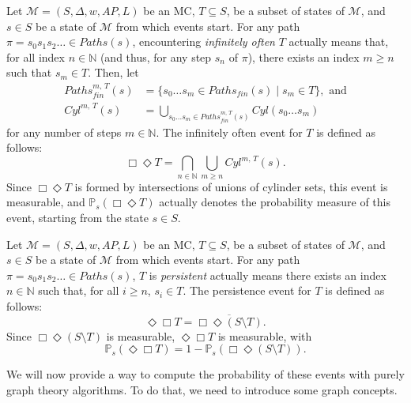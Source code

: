 \begin{definition}
  Let $\mathcal{M}=(S, \Delta, w, AP, L)$ be an MC, $T \subseteq S$, be a subset of states of $\mathcal{M}$, and
  $s \in S$ be a state of $\mathcal{M}$ from which events start. For any path $\pi = s_0 s_1 s_2 \dots \in Paths(s)$,
encountering \textit{infinitely often} $T$ actually means that, for all index $n \in \mathbb{N}$ (and thus, for any step $s_n$ of $\pi$), there exists an index $m \geq n$ such that $s_m \in T$. Then, let
  \begin{align*}
    Paths_{fin}^{m,\, T}(s) &= \{ s_0\dots s_m \in Paths_{fin}(s) \; | \; s_m \in T \}, \text{ and} \\
    Cyl^{m,\, T}(s) &= \bigcup_{s_0 \dots s_m \in Paths_{fin}^{m, \, T}(s)} Cyl(s_0\dots s_m)
  \end{align*}
  for any number of steps $m \in \mathbb{N}$. The infinitely often event for $T$ is defined as follows:
  \[
    \Box \Diamond T = \bigcap_{n \in \mathbb{N}} \bigcup_{m \geq n} Cyl^{m, \, T}(s).
  \]
  Since $\Box \Diamond T$ is formed by intersections of unions of cylinder sets, this event is measurable, and $\mathbb{P}_s(\Box\Diamond T)$ actually denotes the probability measure of this event, starting from the state $s \in S$.
\end{definition}

\begin{definition}
  Let $\mathcal{M}=(S, \Delta, w, AP, L)$ be an MC, $T \subseteq S$, be a subset of states of $\mathcal{M}$, and
  $s \in S$ be a state of $\mathcal{M}$ from which events start. For any path $\pi = s_0 s_1 s_2 \dots \in Paths(s)$,
 $T$ is \textit{persistent} actually means there exists an index $n \in \mathbb{N}$ such that, for all $i\geq n$, $s_i \in T$. The persistence event for $T$ is defined as follows:
 \[
  \Diamond \Box T = \overline{\Box \Diamond (S \setminus T)}.
 \]
 Since $\Box \Diamond (S \setminus T)$ is measurable, $\Diamond \Box T$ is measurable, with \[\mathbb{P}_s(\Diamond \Box T) = 1 - \mathbb{P}_s(\Box \Diamond (S \setminus T)).\]
\end{definition}
We will now provide a way to compute the probability of these events with purely graph theory algorithms. To do that, we need to introduce some graph concepts.

